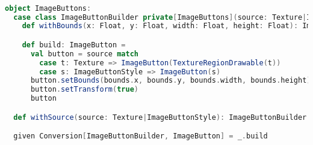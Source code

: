 \begin{lstlisting}[language=Scala, label=code:image-buttons, caption=Builder pattern for ImageButtons]

object ImageButtons:
  case class ImageButtonBuilder private[ImageButtons](source: Texture|ImageButtonStyle, bounds: Rectangle = Rectangle(0, 0, 0, 0)):
    def withBounds(x: Float, y: Float, width: Float, height: Float): ImageButtonBuilder = copy(bounds = Rectangle(x, y, width, height))

    def build: ImageButton =
      val button = source match
        case t: Texture => ImageButton(TextureRegionDrawable(t))
        case s: ImageButtonStyle => ImageButton(s)
      button.setBounds(bounds.x, bounds.y, bounds.width, bounds.height)
      button.setTransform(true)
      button

  def withSource(source: Texture|ImageButtonStyle): ImageButtonBuilder = ImageButtonBuilder(source)

  given Conversion[ImageButtonBuilder, ImageButton] = _.build
  
\end{lstlisting}